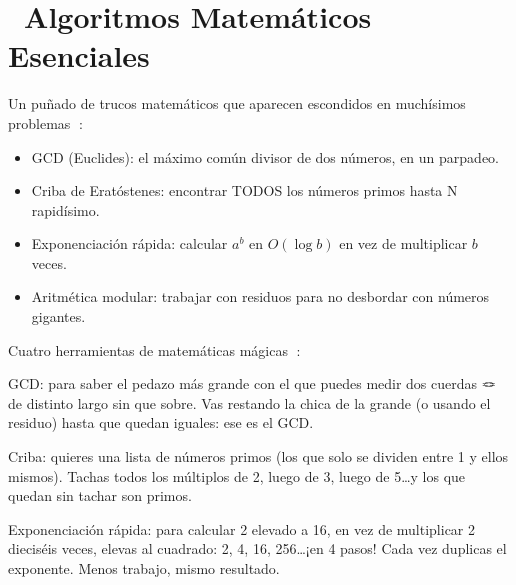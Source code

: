 \chapter[\emj{🧮}~Matemáticas: GCD, Criba y Exponenciación Rápida]{~Algoritmos Matemáticos Esenciales}

\begin{dsaquees}

Un puñado de trucos matemáticos que aparecen escondidos en muchísimos
problemas 🧮:

\begin{itemize}
\item GCD (Euclides): el máximo común divisor de dos números, en un
      parpadeo.
\item Criba de Eratóstenes: encontrar TODOS los números primos hasta N
      rapidísimo.
\item Exponenciación rápida: calcular $a^b$ en $O(\log b)$ en vez de
      multiplicar $b$ veces.
\item Aritmética modular: trabajar con residuos para no desbordar con
      números gigantes.
\end{itemize}

\end{dsaquees}

\begin{dsanino}

Cuatro herramientas de matemáticas mágicas 🎩:

GCD: para saber el pedazo más grande con el que puedes medir dos cuerdas
🪢 de distinto largo sin que sobre. Vas restando la chica de la grande (o
usando el residuo) hasta que quedan iguales: ese es el GCD.

Criba: quieres una lista de números primos (los que solo se dividen entre
1 y ellos mismos). Tachas todos los múltiplos de 2, luego de 3, luego de
5\ldots y los que quedan sin tachar son primos.

Exponenciación rápida: para calcular 2 elevado a 16, en vez de multiplicar
2 dieciséis veces, elevas al cuadrado: 2, 4, 16, 256\ldots ¡en 4 pasos!
Cada vez duplicas el exponente. Menos trabajo, mismo resultado.

\end{dsanino}

